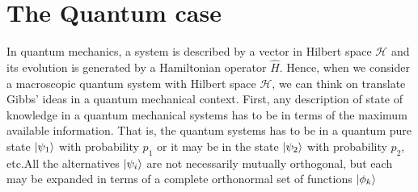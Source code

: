 \section{The Quantum case}

In quantum mechanics, a system is described by a vector in Hilbert space $\mathcal{H}$ and its evolution is generated by a Hamiltonian operator $\hat{H}$. Hence, when we consider a macroscopic quantum system with Hilbert space $\mathcal{H}$, we can think on translate Gibbs' ideas in a quantum mechanical context. First, any description of state of knowledge in a quantum mechanical systems has to be in terms of the maximum available information\cite{PhysRev.108.171}. That is, the quantum systems has to be in a quantum pure state $\mathinner{|{\psi_1}\rangle}$ with probability $p_1$ or it may be in the state $\mathinner{|{\psi_2}\rangle}$ with probability $p_2$, etc.All the alternatives $\mathinner{|{\psi_i}\rangle}$ are not necessarily mutually orthogonal, but each may be expanded in terms of a complete orthonormal set of functions $\mathinner{|{\phi_k}\rangle}$

